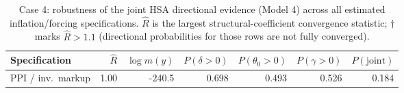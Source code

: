 \begin{table}[H]\centering\small
\caption{Case 4: robustness of the joint HSA directional evidence (Model 4) across all estimated inflation/forcing specifications. $\hat R$ is the largest structural-coefficient convergence statistic; $\dagger$ marks $\hat R>1.1$ (directional probabilities for those rows are not fully converged).}
\label{tab:case4_robust}
\footnotesize\setlength{\tabcolsep}{4.5pt}
\begin{tabular}{@{}lrrrrrr@{}}\toprule
Specification & $\hat R$ & $\log m(y)$ & $P(\delta{>}0)$ & $P(\theta_0{>}0)$ & $P(\gamma{>}0)$ & $P(\text{joint})$ \\\midrule
PPI / inv.\ markup & 1.00 & -240.5 & 0.698 & 0.493 & 0.526 & 0.184 \\
\bottomrule\end{tabular}\end{table}
